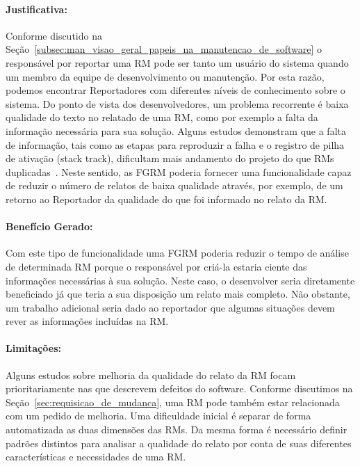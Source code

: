 
\paragraph{Justificativa:}
\label{par:justificativa_s01}

Conforme discutido na
Seção~\ref{subsec:man_visao_geral_papeis_na_manutencao_de_software} o
responsável por reportar uma RM pode ser tanto um usuário do sistema quando um
membro da equipe de desenvolvimento ou manutenção. Por esta razão, podemos
encontrar Reportadores com diferentes níveis de conhecimento sobre o sistema.
Do ponto de vista dos desenvolvedores, um problema recorrente é baixa qualidade
do texto no relatado de uma RM, como por exemplo a falta da informação
necessária para sua solução. Alguns estudos demonstram que a falta de
informação, tais como as etapas para reproduzir a falha e o registro de pilha de
ativação (stack track), dificultam mais andamento do projeto do que RMs
duplicadas~\cite{bettenburg2008makes, bettenburg2007quality}. Neste sentido, as
FGRM poderia fornecer uma funcionalidade capaz de reduzir o número de relatos de
baixa qualidade através, por exemplo, de um retorno ao Reportador da qualidade
do que foi informado no relato da RM\@.

\paragraph{Benefício Gerado:}
\label{par:beneficio_s01}

Com este tipo de funcionalidade uma FGRM poderia reduzir o tempo de análise de
determinada RM porque o responsável por criá-la estaria ciente das
informações necessárias à sua solução. Neste caso, o desenvolver seria
diretamente beneficiado já que teria a sua disposição um relato mais completo.
Não obstante, um trabalho adicional seria dado ao reportador que algumas
situações devem rever as informações incluídas na RM\@.

\paragraph{Limitações:}
\label{par:limitacoes_s01}

Alguns estudos sobre melhoria da qualidade do relato da RM focam
prioritariamente nas que descrevem defeitos do software. Conforme discutimos na
Seção~\ref{sec:requisicao_de_mudanca}, uma RM pode também estar relacionada com
um pedido de melhoria. Uma dificuldade inicial é separar de forma automatizada
as duas dimensões das RMs. Da mesma forma é necessário definir padrões distintos
para analisar a qualidade do relato por conta de suas diferentes características
e necessidades de uma RM\@.

